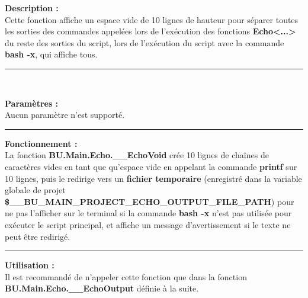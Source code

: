 \documentclass[a4paper,10pt]{article}
\begin{document}
    \begin{justify}
        \textbf{Description :}\\[1\baselineskip]
        Cette fonction affiche un espace vide de 10 lignes de hauteur pour séparer toutes les sorties des commandes appelées lors de l'exécution des fonctions \textbf{\color{func}Echo<...>} du reste des sorties du script, lors de l'exécution du script avec la commande \textbf{\color{cmds}bash -x}, qui affiche tous.
    \end{justify}


    \par\noindent\rule{\textwidth}{0.4pt}\\

    \begin{justify}
        \textbf{Paramètres :}\\[1\baselineskip]
        Aucun paramètre n'est supporté.
    \end{justify}


    \par\noindent\rule{\textwidth}{0.4pt}

    \begin{justify}
        \textbf{Fonctionnement :}\\[1\baselineskip]
        La fonction \textbf{\color{func}BU.Main.Echo.\_\_EchoVoid} crée 10 lignes de chaînes de caractères vides en tant que qu'espace vide en appelant la commande \textbf{\color{cmds}printf} sur 10 lignes, puis le redirige vers un \textbf{\color{path}fichier temporaire} (enregistré dans la variable globale de projet \textbf{\color{vars}\$\_\_BU\_MAIN\_PROJECT\_ECHO\_OUTPUT\_FILE\_PATH}) pour ne pas l'afficher sur le terminal si la commande \textbf{\color{cmds}bash -x} n'est pas utilisée pour exécuter le script principal, et affiche un message d'avertissement si le texte ne peut être redirigé.
    \end{justify}


    \par\noindent\rule{\textwidth}{0.4pt}

    \begin{justify}
        \textbf{Utilisation :}\\[1\baselineskip]
        Il est recommandé de n'appeler cette fonction que dans la fonction \textbf{\color{func}BU.Main.Echo.\_\_EchoOutput} définie à la suite.
    \end{justify}
\end{document}
